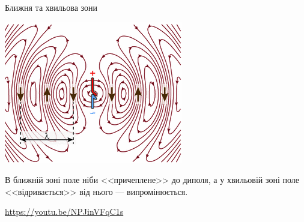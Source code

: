 \documentclass[onlytextwidth]{beamer}
\begin{document}
\begin{frame}{Ближня та хвильова зони}{}
	\begin{center}
		\begin{pict}
			\includegraphics[width=0.5\linewidth]{dipole_radiation}
		\end{pict}
	\end{center}
	\begin{block}{}\justifying
		В ближній зоні поле ніби <<причеплене>> до диполя, а у хвильовій зоні поле <<відривається>> від нього --- випромінюється.
	\end{block}

	\vfill

	{\tiny \url{https://youtu.be/NPJinVFqC1s}}
\end{frame}
\end{document}
